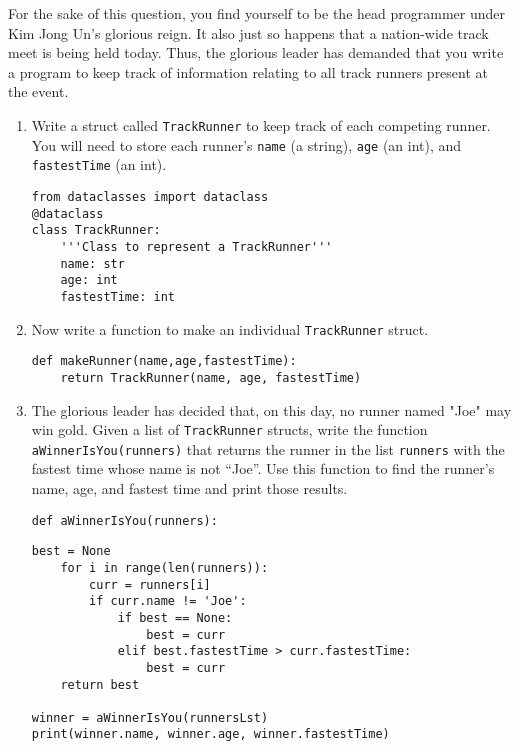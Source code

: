 For the sake of this question, you find yourself to be the head programmer under Kim Jong Un's glorious reign.
It also just so happens that a nation-wide track meet is being held today. Thus, the glorious leader has demanded that
you write a program to keep track of information relating to all track runners present at the event.

\begin{enumerate}
\item Write a struct called \texttt{TrackRunner} to keep track of each competing runner.
You will need to store each runner's \texttt{name} (a string), \texttt{age} (an int), and \texttt{fastestTime} (an int).
\begin{answer}
\begin{lstlisting}[numbers=none]
from dataclasses import dataclass
@dataclass
class TrackRunner:
    '''Class to represent a TrackRunner'''
    name: str
    age: int
    fastestTime: int
\end{lstlisting}
\end{answer}

\item Now write a function to make an individual \texttt{TrackRunner} struct.
\begin{answer}
\begin{lstlisting}[numbers=none]
def makeRunner(name,age,fastestTime):
    return TrackRunner(name, age, fastestTime)
\end{lstlisting}
\end{answer}

\item The glorious leader has decided that, on this day, no runner named "Joe" may win
gold. Given a list of \texttt{TrackRunner} structs, write the function \texttt{aWinnerIsYou(runners)} that returns the runner in the list \texttt{runners} with the fastest time whose name is not ``Joe''.
Use this function to find the runner's name, age, and fastest time and print those results.
\begin{lstlisting}[numbers=none]
def aWinnerIsYou(runners):
\end{lstlisting}
\begin{answer}
\begin{lstlisting}[numbers=none]
    best = None
    for i in range(len(runners)):
        curr = runners[i]
        if curr.name != 'Joe':
            if best == None:
                best = curr
            elif best.fastestTime > curr.fastestTime:
                best = curr
    return best

winner = aWinnerIsYou(runnersLst)
print(winner.name, winner.age, winner.fastestTime)
\end{lstlisting}
\end{answer}
\end{enumerate}
